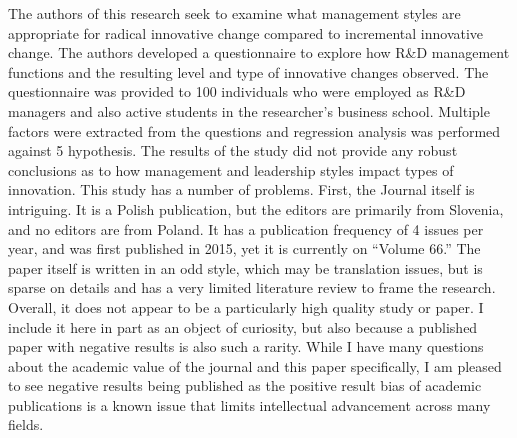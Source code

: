 \begin{adjustwidth}{1in}{}
  \begin{hangpara}{.25in}{1}
\end{hangpara}
\end{adjustwidth}
The authors of this research seek to examine what management styles are appropriate for radical innovative change compared to incremental innovative change. The authors developed a questionnaire to explore how R\&D management functions and the resulting level and type of innovative changes observed. The questionnaire was provided to 100 individuals who were employed as R\&D managers and also active students in the researcher's business school. Multiple factors were extracted from the questions and regression analysis was performed against 5 hypothesis. The results of the study did not provide any robust conclusions as to how management and leadership styles impact types of innovation. This study has a number of problems. First, the Journal itself is intriguing. It is a Polish publication, but the editors are primarily from Slovenia, and no editors are from Poland. It has a publication frequency of 4 issues per year, and was first published in 2015, yet it is currently on ``Volume 66.''  The paper itself is written in an odd style, which may be translation issues, but is sparse on details and has a very limited literature review to frame the research. Overall, it does not appear to be a particularly high quality study or paper. I include it here in part as an object of curiosity, but also because a published paper with negative results is also such a rarity. While I have many questions about the academic value of the journal and this paper specifically, I am pleased to see negative results being published as the positive result bias of academic publications is a known issue that limits intellectual advancement across many fields.



